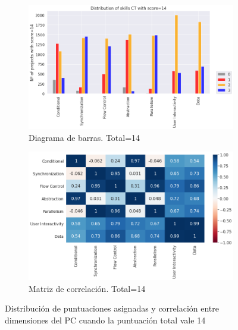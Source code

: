 \documentclass[a4paper, 12pt]{book}
\begin{document}
\begin{figure}[H]
    \centering
    \begin{subfigure}[h]{.49\textwidth} 
        \includegraphics[width=\textwidth]{img/distribucion_14_Snap}
        \caption{Diagrama de barras. Total=14}
        \label{fig:total14_Snap}
    \end{subfigure}       
    \begin{subfigure}[h]{.49\textwidth} 
        \includegraphics[width=\textwidth]{img/corr_14_Snap}
        \caption{Matriz de correlación. Total=14}
        \label{fig:corr14_Snap}
    \end{subfigure}
    \caption{Distribución de puntuaciones asignadas y correlación entre dimensiones del PC cuando la puntuación total vale 14}
\end{figure}
\end{document}
